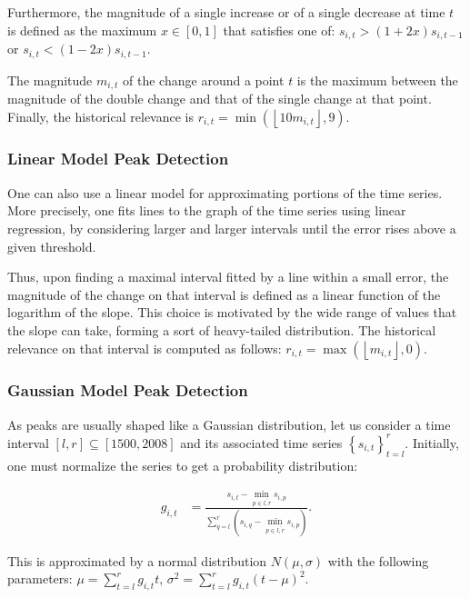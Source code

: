 Furthermore, the magnitude of a single increase or of a single decrease at time $t$ is defined as the maximum $x \in \left[ 0, 1 \right]$ that satisfies one of: $s_{i, t} > \left( 1 + 2x \right) s_{i, t - 1}$ or $s_{i, t} < \left( 1 - 2x \right) s_{i, t - 1}$.

The magnitude $m_{i, t}$ of the change around a point $t$ is the maximum between the magnitude of the double change and that of the single change at that point. Finally, the historical relevance is $r_{i, t} = \min \left( \left\lfloor 10 m_{i, t} \right\rfloor, 9 \right)$.

\subsubsection{Linear Model Peak Detection}

One can also use a linear model for approximating portions of the time series. More precisely, one fits lines to the graph of the time series using linear regression, by considering larger and larger intervals until the error rises above a given threshold.

Thus, upon finding a maximal interval fitted by a line within a small error, the magnitude of the change on that interval is defined as a linear function of the logarithm of the slope. This choice is motivated by the wide range of values that the slope can take, forming a sort of heavy-tailed distribution. The historical relevance on that interval is computed as follows: $r_{i, t} = \max \left( \left\lfloor m_{i, t} \right\rfloor, 0 \right)$.

\subsubsection{Gaussian Model Peak Detection}

As peaks are usually shaped like a Gaussian distribution, let us consider a time interval $\left[ l, r \right] \subseteq \left[ 1500, 2008 \right]$ and its associated time series $\left\{ s_{i, t} \right\}_{t=l}^{r}$. Initially, one must normalize the series to get a probability distribution:

\begin{align}
\label{eq:gaussian-normalization}
g_{i, t} &= \frac{s_{i, t} - \min_{p \in \overline{l, r}} s_{i, p}}{\sum_{q = l}^{r} \left( s_{i, q} - \min_{p \in \overline{l, r}} s_{i, p} \right)}.
\end{align}

This is approximated by a normal distribution $N \left( \mu, \sigma \right)$ with the following parameters: $\mu = \sum_{t=l}^{r} g_{i, t} t$, $\sigma^2 = \sum_{t=l}^{r} g_{i, t} \left( t - \mu \right)^2$.


